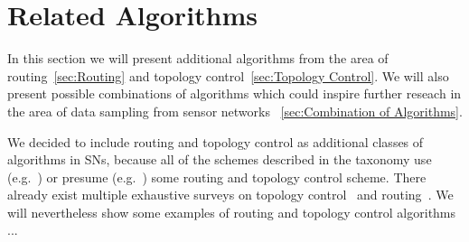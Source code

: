
\section{Related Algorithms}
\label{sec:Related Algorithms}

In this section we will present additional algorithms from the area of
routing~\ref{sec:Routing} and topology control~\ref{sec:Topology Control}. We
will also present possible combinations of algorithms which could inspire
further reseach in the area of data sampling from sensor networks
~\ref{sec:Combination of Algorithms}.


We decided to include routing and topology control as additional classes of
algorithms in \acp{SN}, because all of the schemes described in the taxonomy
use (e.g.~\cite{padhy2006utility}) or presume
(e.g.~\cite{silberstein2006constraint}) some routing and topology control
scheme. There already exist multiple exhaustive surveys on topology
control~\cite{aziz2013survey, li2013survey} and routing~\cite{al2004routing,
pantazis2013energy, singh2010routing}. We will nevertheless show some examples
of routing and topology control algorithms ...

